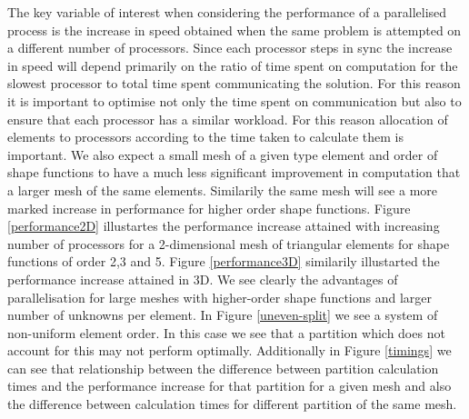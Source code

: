The key variable of interest when considering the performance of a parallelised process is the increase in speed obtained when the same problem is attempted on a different number of processors. Since each processor steps in sync the increase in speed will depend primarily on the ratio of time spent on computation for the slowest processor to total time spent communicating the solution. For this reason it is important to optimise not only the time spent on communication but also to ensure that each processor has a similar workload. For this reason allocation of elements to processors according to the time taken to calculate them is important. We also expect a small mesh of a given type element and order of shape functions to have a much less significant improvement in computation that a larger mesh of the same elements. Similarily the same mesh will see a more marked increase in performance for higher order shape functions. Figure \ref{performance2D} illustartes the performance increase attained with increasing number of processors for a 2-dimensional mesh of triangular elements for shape functions of order 2,3 and 5. Figure \ref{performance3D} similarily illustarted the performance increase attained in 3D. We see clearly the advantages of parallelisation for large meshes with higher-order shape functions and larger number of unknowns per element.
In Figure \ref{uneven-split} we see a system of non-uniform element order. In this case we see that a partition which does not account for this may not perform optimally. Additionally in Figure \ref{timings} we can see that relationship between the difference between partition calculation times and the performance increase for that partition for a given mesh and also the difference between calculation times for different partition of the same mesh.


